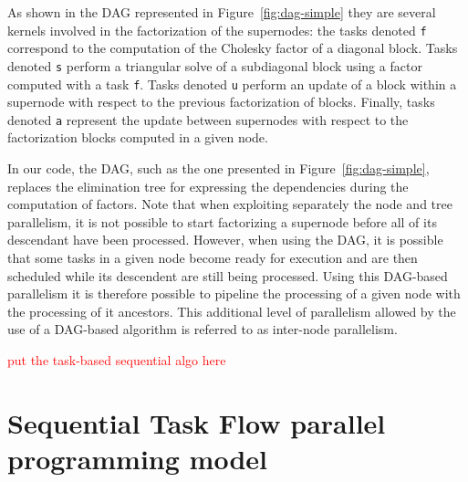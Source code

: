 \documentclass{article}
\newcommand{\alert}[1]{\textcolor{red}{#1}\xspace}
\begin{document}
As shown in the DAG represented in Figure~\ref{fig:dag-simple} they
are several kernels involved in the factorization of the supernodes:
the tasks denoted \texttt{f} correspond to the computation of the
Cholesky factor of a diagonal block. Tasks denoted \texttt{s} perform
a triangular solve of a subdiagonal block using a factor computed with
a task \texttt{f}. Tasks denoted \texttt{u} perform an update of a
block within a supernode with respect to the previous factorization of
blocks. Finally, tasks denoted \texttt{a} represent the update between
supernodes with respect to the factorization blocks computed in a
given node. 

In our code, the DAG, such as the one presented in
Figure~\ref{fig:dag-simple}, replaces the elimination tree for
expressing the dependencies during the computation of factors. Note
that when exploiting separately the node and tree parallelism, it is
not possible to start factorizing a supernode before all of its
descendant have been processed. However, when using the DAG, it is
possible that some tasks in a given node become ready for execution
and are then scheduled while its descendent are still being
processed. Using this DAG-based parallelism it is therefore possible
to pipeline the processing of a given node with the processing of it
ancestors. This additional level of parallelism allowed by the use of
a DAG-based algorithm is referred to as inter-node parallelism.

\alert{put the task-based sequential algo here}
 
\section{Sequential Task Flow parallel programming model}\label{sec:stf-model}
\end{document}
